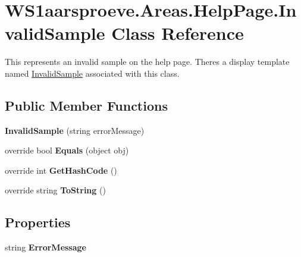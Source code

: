 \hypertarget{class_w_s1aarsproeve_1_1_areas_1_1_help_page_1_1_invalid_sample}{}\section{W\+S1aarsproeve.\+Areas.\+Help\+Page.\+Invalid\+Sample Class Reference}
\label{class_w_s1aarsproeve_1_1_areas_1_1_help_page_1_1_invalid_sample}


This represents an invalid sample on the help page. There\textquotesingle{}s a display template named \hyperlink{class_w_s1aarsproeve_1_1_areas_1_1_help_page_1_1_invalid_sample}{Invalid\+Sample} associated with this class.  


\subsection*{Public Member Functions}
\begin{DoxyCompactItemize}
\item 
\hypertarget{class_w_s1aarsproeve_1_1_areas_1_1_help_page_1_1_invalid_sample_a7d27ee6e7d069862acb1241c8e6f02bd}{}{\bfseries Invalid\+Sample} (string error\+Message)\label{class_w_s1aarsproeve_1_1_areas_1_1_help_page_1_1_invalid_sample_a7d27ee6e7d069862acb1241c8e6f02bd}

\item 
\hypertarget{class_w_s1aarsproeve_1_1_areas_1_1_help_page_1_1_invalid_sample_ab0048fecd95fcebccc875e4c50526415}{}override bool {\bfseries Equals} (object obj)\label{class_w_s1aarsproeve_1_1_areas_1_1_help_page_1_1_invalid_sample_ab0048fecd95fcebccc875e4c50526415}

\item 
\hypertarget{class_w_s1aarsproeve_1_1_areas_1_1_help_page_1_1_invalid_sample_ab494a3c25f56b2e399df3124dbdf827b}{}override int {\bfseries Get\+Hash\+Code} ()\label{class_w_s1aarsproeve_1_1_areas_1_1_help_page_1_1_invalid_sample_ab494a3c25f56b2e399df3124dbdf827b}

\item 
\hypertarget{class_w_s1aarsproeve_1_1_areas_1_1_help_page_1_1_invalid_sample_a8d2d450b6af0f2dcc0e8bbd7e53d715d}{}override string {\bfseries To\+String} ()\label{class_w_s1aarsproeve_1_1_areas_1_1_help_page_1_1_invalid_sample_a8d2d450b6af0f2dcc0e8bbd7e53d715d}

\end{DoxyCompactItemize}
\subsection*{Properties}
\begin{DoxyCompactItemize}
\item 
\hypertarget{class_w_s1aarsproeve_1_1_areas_1_1_help_page_1_1_invalid_sample_ae36e24e82f2dd80b6d013f636a3b82cd}{}string {\bfseries Error\+Message}\label{class_w_s1aarsproeve_1_1_areas_1_1_help_page_1_1_invalid_sample_ae36e24e82f2dd80b6d013f636a3b82cd}

\end{DoxyCompactItemize}


